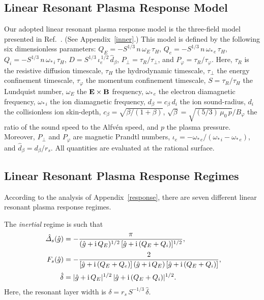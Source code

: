 \documentclass[12pt,prb,aps]{revtex4-1}
\begin{document}
\subsection{Linear Resonant Plasma Response Model}
Our adopted linear resonant plasma response model is the three-field model presented in Ref.~. (See Appendix~\ref{inner}.) This model is defined by the following six
dimensionless parameters: $Q_E= -S^{1/3}\,n\,\omega_E\,\tau_H$, $Q_e = -S^{1/3}\,n\,\omega_{\ast\,e}\,\tau_H$, $Q_i = -S^{1/3}\,n\,\omega_{\ast\,i}\,\tau_H$,
$D=S^{1/3}\,\iota_e^{\,1/2}\,\hat{d}_\beta$, $P_\perp=\tau_R/\tau_\perp$, and $P_\varphi= \tau_R/\tau_\varphi$. Here, $\tau_R$ is the resistive diffusion timescale, $\tau_H$ the hydrodynamic timescale, $\tau_\perp$ the energy confinement timescale,
$\tau_\varphi$ the momentum confinement timescale, $S=\tau_R/\tau_H$ the Lundquist number, $\omega_E$ the ${\bf E}\times {\bf B}$ frequency, $\omega_{\ast\,e}$ the
electron diamagnetic frequency, $\omega_{\ast\,i}$ the ion diamagnetic frequency, $d_\beta=c_\beta\,d_i$ the ion sound-radius, $d_i$ the collisionless ion skin-depth, 
$c_\beta=\sqrt{\beta/(1+\beta)}$, $\sqrt{\beta}=\sqrt{(5/3)\,\mu_0\,p}/B_\varphi$ the ratio of the sound speed
to the Alfv\'{e}n speed, and $p$ the plasma pressure.   Moreover,
$P_\perp$ and $P_\varphi$ are magnetic Prandtl numbers, 
$\iota_e = - \omega_{\ast\,e}/(\omega_{\ast\,i}-\omega_{\ast\,e})$, and $\hat{d}_\beta= d_\beta/r_s$. All quantities are evaluated at the
rational surface. 

\subsection{Linear Resonant Plasma Response Regimes}
According to the analysis of Appendix~\ref{response}, there are seven different linear resonant plasma response regimes. 

The {\em inertial}\/ regime is such that 
 \begin{align}\
\hat{\mit\Delta}_s(\hat{g}) &= -\frac{\pi}{(\hat{g}+{\rm i}\,Q_E)^{1/2}\,[\hat{g}+{\rm i}\,(Q_E+Q_i)]^{1/2}},\label{in1}\\[0.5ex]
F_s(\hat{g})&= - \frac{2}{[\hat{g}+{\rm i}\,(Q_E+Q_e)]\,(\hat{g}+{\rm i}\,Q_E)\,[\hat{g}+{\rm i}\,(Q_E+Q_i)]},\label{in2}\\[0.5ex]
\hat{\delta} &= |\hat{g}+{\rm i}\,Q_E|^{1/2}\,|\hat{g}+ {\rm i}\,(Q_E+Q_i)|^{1/2}.\label{in3}
\end{align}
Here, the resonant layer width is $\delta = r_s\,S^{-1/3}\,\hat{\delta}$. 
\end{document}
